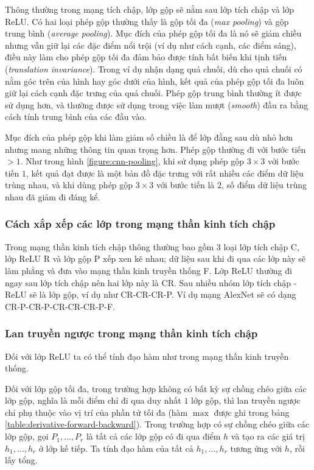 Thông thường trong mạng tích chập, lớp gộp sẽ nằm sau lớp tích chập và lớp ReLU. Có hai loại phép gộp thường thấy là gộp tối đa (\textit{max pooling}) và gộp trung bình (\textit{average pooling}). Mục đích của phép gộp tối đa là nó sẽ giảm chiều nhưng vẫn giữ lại các đặc điểm nổi trội (ví dụ như cách cạnh, các điểm sáng), điều này làm cho phép gộp tối đa đảm bảo được tính bất biến khi tịnh tiến (\textit{translation invariance}). Trong ví dụ nhận dạng quả chuối, dù cho quả chuối có nằm góc trên của hình hay góc dưới của hình, kết quả của phép gộp tối đa luôn giữ lại cách cạnh đặc trưng của quả chuối. Phép gộp trung bình thường ít được sử dụng hơn, và thường được sử dụng trong việc làm mượt (\textit{smooth}) đầu ra bằng cách tính trung bình của các đầu vào. \cite{Aggarwal2023-zk}

Mục đích của phép gộp khi làm giảm số chiều là để lớp đằng sau dù nhỏ hơn nhưng mang những thông tin quan trọng hơn. Phép gộp thường đi với bước tiến $>1$. Như trong hình \ref{figure:cnn-pooling}, khi sử dụng phép gộp $3\times 3$ với bước tiến $1$, kết quả đạt được là một bản đồ đặc trưng với rất nhiều các điểm dữ liệu trùng nhau, và khi dùng phép gộp $3\times 3$ với bước tiến là $2$, số điểm dữ liệu trùng nhau đã giảm đi đáng kể.

\subsubsection{Cách xắp xếp các lớp trong mạng thần kinh tích chập}
Trong mạng thần kinh tích chập thông thường bao gồm $3$ loại lớp tích chập C, lớp ReLU R và lớp gộp P xếp xen kẽ nhau; dữ liệu sau khi đi qua các lớp này sẽ làm phẳng và đưa vào mạng thần kinh truyền thống F. Lớp ReLU thường đi ngay sau lớp tích chập nên hai lớp này là CR. Sau nhiều nhóm lớp tích chập - ReLU sẽ là lớp gộp, ví dụ như CR-CR-CR-P. Ví dụ mạng AlexNet sẽ có dạng CR-P-CR-P-CR-CR-CR-P-F.

\subsubsection{Lan truyền ngược trong mạng thần kinh tích chập}
Đối với lớp ReLU ta có thể tính đạo hàm như trong mạng thần kinh truyền thống.

Đối với lớp gộp tối đa, trong trường hợp không có bất kỳ sự chồng chéo giữa các lớp gộp, nghĩa là mỗi điểm chỉ đi qua duy nhất $1$ lớp gộp, thì lan truyền ngược chỉ phụ thuộc vào vị trí của phần tử tối đa (hàm $\max$ được ghi trong bảng \ref{table:derivative-forward-backward}). Trong trường hợp có sự chồng chéo giữa các lớp gộp, gọi $P_1,\dots,P_r$ là tất cả các lớp gộp có đi qua điểm $h$ và tạo ra các giá trị $h_1,\dots,h_r$ ở lớp kế tiếp. Ta tính đạo hàm của tất cả $h_1,\dots,h_r$ tương ứng với $h$, rồi lấy tổng.

